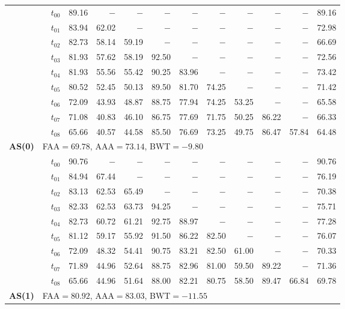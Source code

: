 \begin{table}[ht]
\begin{tabular}{@{}l l l *{10}{r}@{}}
 & & $t_{00}$ & 89.16 & $-$ & $-$ & $-$ & $-$ & $-$ & $-$ & $-$ & $-$ & 89.16 \\
 & & $t_{01}$ & 83.94 & 62.02 & $-$ & $-$ & $-$ & $-$ & $-$ & $-$ & $-$ & 72.98 \\
 & & $t_{02}$ & 82.73 & 58.14 & 59.19 & $-$ & $-$ & $-$ & $-$ & $-$ & $-$ & 66.69 \\
 & & $t_{03}$ & 81.93 & 57.62 & 58.19 & 92.50 & $-$ & $-$ & $-$ & $-$ & $-$ & 72.56 \\
 & & $t_{04}$ & 81.93 & 55.56 & 55.42 & 90.25 & 83.96 & $-$ & $-$ & $-$ & $-$ & 73.42 \\
 & & $t_{05}$ & 80.52 & 52.45 & 50.13 & 89.50 & 81.70 & 74.25 & $-$ & $-$ & $-$ & 71.42 \\
 & & $t_{06}$ & 72.09 & 43.93 & 48.87 & 88.75 & 77.94 & 74.25 & 53.25 & $-$ & $-$ & 65.58 \\
 & & $t_{07}$ & 71.08 & 40.83 & 46.10 & 86.75 & 77.69 & 71.75 & 50.25 & 86.22 & $-$ & 66.33 \\
 & & $t_{08}$ & 65.66 & 40.57 & 44.58 & 85.50 & 76.69 & 73.25 & 49.75 & 86.47 & 57.84 & 64.48 \\
\midrule
\multirow{10}{*}{\textbf{AS(0)}} & \multicolumn{11}{l}{\quad\small FAA$=69.78$,\; AAA$=73.14$,\; BWT$=-9.80$} \\
 & & $t_{00}$ & 90.76 & $-$ & $-$ & $-$ & $-$ & $-$ & $-$ & $-$ & $-$ & 90.76 \\
 & & $t_{01}$ & 84.94 & 67.44 & $-$ & $-$ & $-$ & $-$ & $-$ & $-$ & $-$ & 76.19 \\
 & & $t_{02}$ & 83.13 & 62.53 & 65.49 & $-$ & $-$ & $-$ & $-$ & $-$ & $-$ & 70.38 \\
 & & $t_{03}$ & 82.33 & 62.53 & 63.73 & 94.25 & $-$ & $-$ & $-$ & $-$ & $-$ & 75.71 \\
 & & $t_{04}$ & 82.73 & 60.72 & 61.21 & 92.75 & 88.97 & $-$ & $-$ & $-$ & $-$ & 77.28 \\
 & & $t_{05}$ & 81.12 & 59.17 & 55.92 & 91.50 & 86.22 & 82.50 & $-$ & $-$ & $-$ & 76.07 \\
 & & $t_{06}$ & 72.09 & 48.32 & 54.41 & 90.75 & 83.21 & 82.50 & 61.00 & $-$ & $-$ & 70.33 \\
 & & $t_{07}$ & 71.89 & 44.96 & 52.64 & 88.75 & 82.96 & 81.00 & 59.50 & 89.22 & $-$ & 71.36 \\
 & & $t_{08}$ & 65.66 & 44.96 & 51.64 & 88.00 & 82.21 & 80.75 & 58.50 & 89.47 & 66.84 & 69.78 \\
\midrule
\multirow{10}{*}{\textbf{AS(1)}} & \multicolumn{11}{l}{\quad\small FAA$=80.92$,\; AAA$=83.03$,\; BWT$=-11.55$} \\

\end{tabular}
\end{table}

